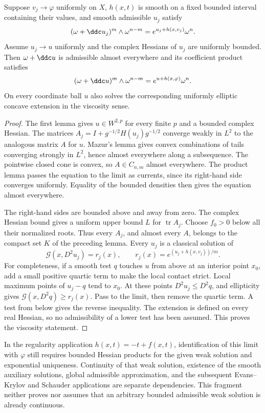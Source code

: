 \begin{proposition}\label{draft:603-proper-auxiliary-limit}
Suppose $v_j\to\varphi$ uniformly on $X$, $h(x,t)$ is smooth on a fixed
bounded interval containing their values, and smooth admissible $u_j$
satisfy
\[
 (\omega+\ddc u_j)^m\wedge\omega^{n-m}
           =e^{u_j+h(x,v_j)}\omega^n.
\]
Assume $u_j\to u$ uniformly and the complex Hessians of $u_j$ are uniformly
bounded. Then $\omega+\ddc u$ is admissible almost everywhere and its
coefficient product satisfies
\[
 (\omega+\ddc u)^m\wedge\omega^{n-m}
           =e^{u+h(x,\varphi)}\omega^n.
\]
On every coordinate ball $u$ also solves the corresponding uniformly
elliptic concave extension in the viscosity sense.
\end{proposition}
\begin{proof}
The first lemma gives $u\in W^{2,p}$ for every finite $p$ and a bounded
complex Hessian. The matrices
$A_j=I+g^{-1/2}H(u_j)g^{-1/2}$ converge weakly in $L^2$ to the analogous
matrix $A$ for $u$. Mazur's lemma gives convex combinations of tails
converging strongly in $L^2$, hence almost everywhere along a subsequence.
The pointwise closed cone is convex, so $A\in C_{n,m}$ almost everywhere.
The product lemma passes the equation to the limit as currents, since its
right-hand side converges uniformly. Equality of the bounded densities
then gives the equation almost everywhere.

The right-hand sides are bounded above and away from zero. The complex
Hessian bound gives a uniform upper bound $L$ for $\operatorname{tr}A_j$.
Choose $f_0>0$ below all their normalized roots. Thus every $A_j$, and
almost every $A$, belongs to the compact set $K$ of the preceding lemma.
Every $u_j$ is a classical solution of
\[
 \mathcal G(x,D^2u_j)=r_j(x),\qquad
               r_j(x)=e^{(u_j+h(x,v_j))/m}.
\]
For completeness, if a smooth test $q$ touches $u$ from above at an
interior point $x_0$, add a small positive quartic term to make the local
contact strict. Local maximum points of $u_j-q$ tend to $x_0$.
At these points $D^2u_j\leq D^2q$, and ellipticity gives
$\mathcal G(x,D^2q)\geq r_j(x)$. Pass to the limit, then remove the quartic
term. A test from below gives the reverse inequality. The extension is
defined on every real Hessian, so no admissibility of a lower test has
been assumed. This proves the viscosity statement.
\end{proof}

In the regularity application $h(x,t)=-t+f(x,t)$, identification of this
limit with $\varphi$ still requires bounded Hessian products for the given
weak solution and exponential uniqueness. Continuity of that weak
solution, existence of the smooth auxiliary solutions, global admissible
approximation, and the subsequent Evans--Krylov and Schauder applications
are separate dependencies. This fragment neither proves nor assumes that
an arbitrary bounded admissible weak solution is already continuous.

